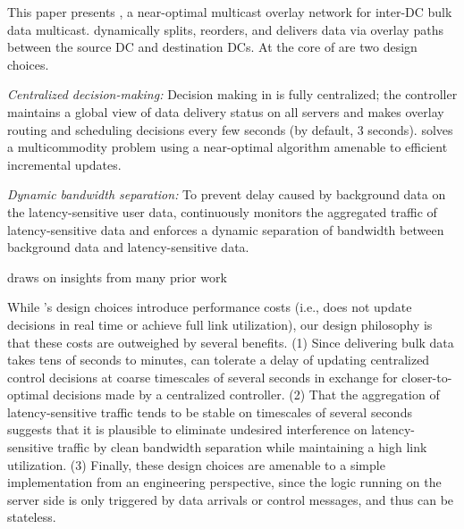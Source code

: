 This paper presents {\em \name}, a near-optimal multicast 
overlay network for inter-DC bulk data multicast.
\name dynamically splits, reorders, and delivers data via 
overlay paths between the source DC and destination DCs.
At the core of \name are two design choices.
\begin{packeditemize} 
\item {\em Centralized decision-making:} 
Decision making in \name is fully centralized; the \name controller 
maintains a global view of data delivery status on all servers 
and makes overlay routing and scheduling decisions every 
few seconds (by default, 3 seconds).
\name solves a multicommodity problem using 
a near-optimal algorithm amenable to efficient incremental 
updates.
\item {\em Dynamic bandwidth separation:}
To prevent delay caused by background data on the 
latency-sensitive user data, \name continuously monitors the 
aggregated traffic 
of latency-sensitive data and enforces a dynamic  separation of 
bandwidth between background data and latency-sensitive data. 
\end{packeditemize}

\name draws on insights from many prior work

While \name's design choices introduce performance costs (i.e.,
\name does not update decisions in real time or achieve full 
link utilization), our design philosophy is that these costs are 
outweighed by several benefits.
(1) Since delivering bulk data takes tens of seconds to 
minutes, \name can tolerate a delay of updating centralized 
control decisions at coarse timescales of several 
seconds in exchange for closer-to-optimal decisions made by a 
centralized controller.
(2) That the aggregation of latency-sensitive traffic tends to 
be stable on timescales of several seconds suggests that it is 
plausible to eliminate undesired interference on 
latency-sensitive traffic by clean bandwidth separation 
while maintaining a high link utilization.
(3) Finally, these design choices are amenable to a simple
implementation from an engineering perspective, 
since the logic running on the server side is 
only triggered by data arrivals or control messages, and 
thus can be stateless.


